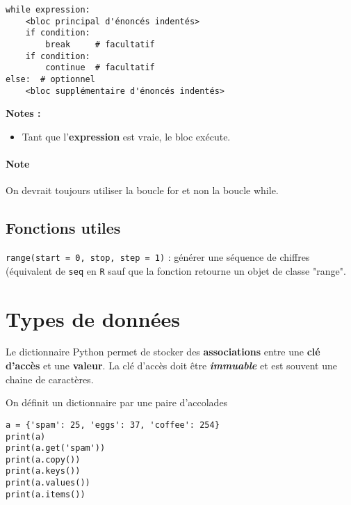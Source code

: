 \documentclass[10pt, french]{article}
\begin{document}
\begin{multicols*}{2}
\begin{definitionNOHFILLsub}
\begin{lstlisting}
while expression:
    <bloc principal d'énoncés indentés>
    if condition: 
        break     # facultatif
    if condition: 
        continue  # facultatif
else:  # optionnel
    <bloc supplémentaire d'énoncés indentés>
\end{lstlisting}

\textbf{Notes :}
\begin{itemize}
	\item	Tant que l'\textbf{expression} est vraie, le bloc exécute.
\end{itemize} 
\end{definitionNOHFILLsub}

\paragraph{Note}	On devrait toujours utiliser la boucle for et non la boucle while.



\subsection{Fonctions utiles}
\texttt{range(start = 0, stop, step = 1)} : générer une séquence de chiffres (équivalent de \texttt{seq} en \texttt{R} sauf que la fonction retourne un objet de classe "range".


\newpage
\section{Types de données}
\begin{definitionNOHFILL}[Dictionnaire]
Le dictionnaire Python permet de stocker des \textbf{associations} entre une \textbf{clé d'accès} et une \textbf{valeur}. La clé d'accès doit être \textbf{\textit{immuable}} et est souvent une chaine de caractères.

\bigskip

On définit un dictionnaire par une paire d'accolades 

\bigskip

\begin{definitionNOHFILLprop}
\begin{lstlisting}
a = {'spam': 25, 'eggs': 37, 'coffee': 254}
print(a)
print(a.get('spam'))
print(a.copy())
print(a.keys())
print(a.values())
print(a.items())
\end{lstlisting}
\end{definitionNOHFILLprop}
\end{definitionNOHFILL}



\end{multicols*}
\end{document}
